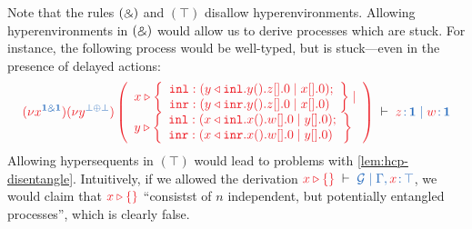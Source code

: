 \documentclass[submission,copyright,creativecommons]{eptcs}
\begin{document}
Note that the rules $(\mathbin{\binampersand})$ and $(\top)$ disallow hyperenvironments. Allowing hyperenvironments in $(\mathbin{\binampersand})$ would allow us to derive processes which are stuck. For instance, the following process would be well-typed, but is stuck---even in the presence of delayed actions:
\[
\seq[{
  \tm{\piNew{x^{\ty{\one \with \one}}}{\piNew{y^{\ty{\bot \plus \bot}}}{\left(
          \begin{array}{l}
            x \triangleright
            \left\{
            \begin{array}{l}
              \texttt{inl}: (\cpInl{y}{\cpWait{y}{\cpHalt{z}}} \ppar \cpHalt{x});
              \\
              \texttt{inr}: (\cpInr{y}{\cpWait{y}{\cpHalt{z}}} \ppar \cpHalt{x})
            \end{array}
            \right\}
            \ppar
            \\
            y \triangleright
            \left\{
            \begin{array}{l}
              \texttt{inl}: (\cpInl{x}{\cpWait{x}{\cpHalt{w}}} \ppar \cpHalt{y});
              \\
              \texttt{inr}: (\cpInr{x}{\cpWait{x}{\cpHalt{w}}} \ppar \cpHalt{y})
            \end{array}
            \right\}
          \end{array}
        \right)}}}
}]{
  \tmty{z}{\one} \hsep \tmty{w}{\one}
}
\]
Allowing hypersequents in $(\top)$ would lead to problems with \cref{lem:hcp-disentangle}. Intuitively, if we allowed the derivation $\seq[\cpAbsurd{x}]{\mathcal{G} \hsep \Gamma, \tmty{x}{\top}}$, we would claim that $\tm{\cpAbsurd{x}}$ ``consistst of $n$ independent, but potentially entangled processes'', which is clearly false.
\end{document}
